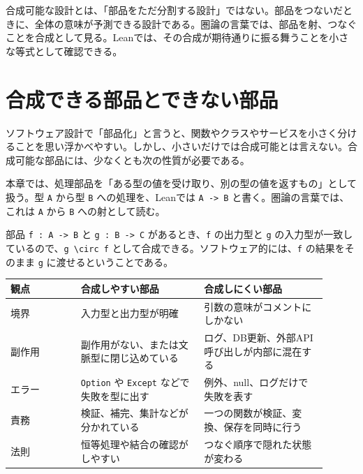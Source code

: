\begin{intuitionbox}
合成可能な設計とは、「部品をただ分割する設計」ではない。部品をつないだときに、全体の意味が予測できる設計である。圏論の言葉では、部品を射、つなぐことを合成として見る。Leanでは、その合成が期待通りに振る舞うことを小さな等式として確認できる。
\end{intuitionbox}


\section{合成できる部品とできない部品}

ソフトウェア設計で「部品化」と言うと、関数やクラスやサービスを小さく分けることを思い浮かべやすい。しかし、小さいだけでは合成可能とは言えない。合成可能な部品には、少なくとも次の性質が必要である。

\begin{definitionbox}
本章では、処理部品を「ある型の値を受け取り、別の型の値を返すもの」として扱う。型 \texttt{A} から型 \texttt{B} への処理を、Leanでは \texttt{A -> B} と書く。圏論の言葉では、これは \texttt{A} から \texttt{B} への射として読む。
\end{definitionbox}

部品 \texttt{f : A -> B} と \texttt{g : B -> C} があるとき、\texttt{f} の出力型と \texttt{g} の入力型が一致しているので、\texttt{g \textbackslash{}circ f} として合成できる。ソフトウェア的には、\texttt{f} の結果をそのまま \texttt{g} に渡せるということである。

\begin{longtable}{p{0.20\linewidth}p{0.35\linewidth}p{0.35\linewidth}}
\toprule
観点 & 合成しやすい部品 & 合成しにくい部品 \\
\midrule
境界 & 入力型と出力型が明確 & 引数の意味がコメントにしかない \\
副作用 & 副作用がない、または文脈型に閉じ込めている & ログ、DB更新、外部API呼び出しが内部に混在する \\
エラー & \texttt{Option} や \texttt{Except} などで失敗を型に出す & 例外、null、ログだけで失敗を表す \\
責務 & 検証、補完、集計などが分かれている & 一つの関数が検証、変換、保存を同時に行う \\
法則 & 恒等処理や結合の確認がしやすい & つなぐ順序で隠れた状態が変わる \\
\bottomrule
\end{longtable}

